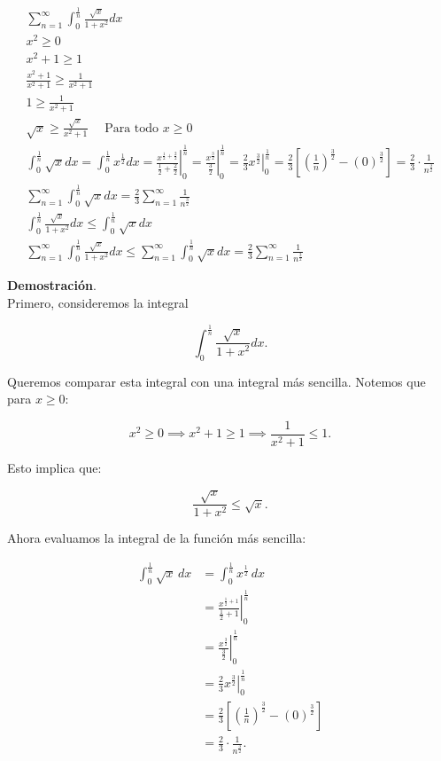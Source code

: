 \documentclass{article}
\begin{document}
    $$
    \begin{gathered}
    \sum_{n=1}^{\infty} \int_{0}^{\frac{1}{n}} \frac{\sqrt{x}}{1+x^{2}} d x \\
    x^{2} \geq 0 \\
    x^{2}+1 \geq 1 \\
    \frac{x^{2}+1}{x^{2}+1} \geq \frac{1}{x^{2}+1} \\
    1 \geq \frac{1}{x^{2}+1} \\
    \sqrt{x} \geq \frac{\sqrt{x}}{x^{2}+1} \quad \text { Para todo } x \geq 0 \\
    \int_{0}^{\frac{1}{n}} \sqrt{x} d x=\int_{0}^{\frac{1}{n}} x^{\frac{1}{2}} d x=\left.\frac{x^{\frac{1}{2}+\frac{2}{2}}}{\frac{1}{2}+\frac{2}{2}}\right|_{0} ^{\frac{1}{n}}=\left.\frac{x^{\frac{3}{2}}}{\frac{3}{2}}\right|_{0} ^{\frac{1}{n}}=\left.\frac{2}{3} x^{\frac{3}{2}}\right|_{0} ^{\frac{1}{n}}=\frac{2}{3}\left[\left(\frac{1}{n}\right)^{\frac{3}{2}}-(0)^{\frac{3}{2}}\right]=\frac{2}{3} \cdot \frac{1}{n^{\frac{3}{2}}} \\
    \sum_{n=1}^{\infty} \int_{0}^{\frac{1}{n}} \sqrt{x} d x=\frac{2}{3} \sum_{n=1}^{\infty} \frac{1}{n^{\frac{3}{2}}} \\
    \int_{0}^{\frac{1}{n}} \frac{\sqrt{x}}{1+x^{2}} d x \leq \int_{0}^{\frac{1}{n}} \sqrt{x} d x \\
    \sum_{n=1}^{\infty} \int_{0}^{\frac{1}{n}} \frac{\sqrt{x}}{1+x^{2}} d x \leq \sum_{n=1}^{\infty} \int_{0}^{\frac{1}{n}} \sqrt{x} d x=\frac{2}{3} \sum_{n=1}^{\infty} \frac{1}{n^{\frac{3}{2}}}
    \end{gathered}
    $$

    \textbf{Demostración}.\\

    Primero, consideremos la integral

    $$ \int_{0}^{\frac{1}{n}} \frac{\sqrt{x}}{1+x^{2}} dx. $$

    Queremos comparar esta integral con una integral más sencilla. Notemos que para $x \geq 0$:

    $$ x^2 \geq 0 \implies x^2 + 1 \geq 1 \implies \frac{1}{x^2 + 1} \leq 1. $$

    Esto implica que:

    $$ \frac{\sqrt{x}}{1 + x^2} \leq \sqrt{x}. $$

    Ahora evaluamos la integral de la función más sencilla:

    $$
    \begin{align*}
    \int_{0}^{\frac{1}{n}} \sqrt{x} \, dx &= \int_{0}^{\frac{1}{n}} x^{\frac{1}{2}} \, dx \\
    &= \left. \frac{x^{\frac{1}{2} + 1}}{\frac{1}{2} + 1} \right|_{0}^{\frac{1}{n}} \\
    &= \left. \frac{x^{\frac{3}{2}}}{\frac{3}{2}} \right|_{0}^{\frac{1}{n}} \\
    &= \left. \frac{2}{3} x^{\frac{3}{2}} \right|_{0}^{\frac{1}{n}} \\
    &= \frac{2}{3} \left[ \left( \frac{1}{n} \right)^{\frac{3}{2}} - (0)^{\frac{3}{2}} \right] \\
    &= \frac{2}{3} \cdot \frac{1}{n^{\frac{3}{2}}}.
    \end{align*}
    $$
\end{document}
